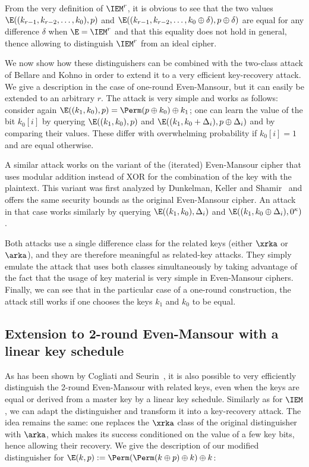 From the very definition of $\IEM^r$, it
is obvious to see that the two values $\E((k_{r-1}, k_{r-2},\linebreak[1] \ldots, k_0), p)$
and $\E((k_{r-1}, k_{r-2}, \ldots, k_0 \oplus \delta), p \oplus \delta)$ are equal for any
difference $\delta$ when
$\E = \IEM^r$ and that this equality does not hold in general, thence allowing to distinguish
$\IEM^r$ from an ideal cipher.


\medskip

We now show how these distinguishers can be combined with the two-class attack of Bellare and Kohno
in order to extend it to a very efficient key-recovery attack. We give a description in the case of one-round
Even-Mansour, but it can easily be extended to an arbitrary $r$. The attack is very simple and works
as follows: consider again $\E((k_1, k_0), p) = \Perm(p \oplus k_0) \oplus k_1$; one can learn
the value of the bit $k_0[i]$ by querying $\E((k_1, k_0), p)$ and
$\E((k_1, k_0 + \Delta_i), p \oplus \Delta_i)$
and by comparing their values. These  differ with overwhelming probability
if $k_0[i] = 1$ and are equal otherwise.

A similar attack works on the variant of the (iterated) Even-Mansour cipher
that uses modular addition instead of XOR for the combination of the key with the plaintext.
This variant was first analyzed by Dunkelman, Keller and Shamir~\cite{DKS12} and offers the same security bounds as the
original Even-Mansour cipher. An attack in that case works similarly
by querying \eg $\E((k_1, k_0), \Delta_i)$ and
$\E((k_1, k_0 \oplus \Delta_i), 0^\kappa)$.

Both attacks use a single difference class for the related keys (either $\xrka$ or $\arka$),
and they are therefore meaningful as related-key attacks. They simply emulate the attack that uses both
classes simultaneously by taking advantage of the fact that the usage of key material is very simple in
Even-Mansour ciphers.
Finally, we can see that in the particular case of a one-round construction, the attack still works if one
chooses the keys $k_1$ and $k_0$ to be equal.

\subsection{Extension to 2-round Even-Mansour with a linear key schedule}

As has been shown by Cogliati and Seurin~\cite{CS15}, it is also possible to very efficiently distinguish the
2-round Even-Mansour with related keys, even when the keys are equal or derived
from a master key by a linear key schedule. Similarly as for $\IEM$, we can adapt
the distinguisher and transform it into a key-recovery attack. The idea remains the same: one
replaces the $\xrka$ class of the original distinguisher with $\arka$, which makes its success
conditioned on the value of a few key bits, hence allowing their recovery. We give
the description of our modified distinguisher for $\E(k, p) := \Perm(\Perm(k \oplus p) \oplus k) \oplus k$:

